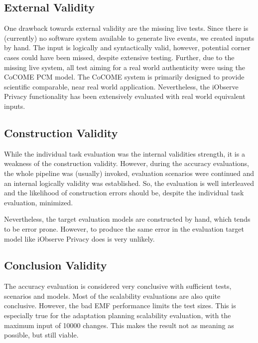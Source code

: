 \subsection{External Validity} %

One drawback towards external validity are the missing live tests. Since there is (currently) no software system available to generate live events, we created inputs by hand. The input is logically and syntactically valid, however, potential corner cases could have been missed, despite extensive testing. Further, due to the missing live system, all test aiming for a real world authenticity were using the CoCOME PCM model. The CoCOME system is primarily designed to provide scientific comparable, near real world application. Nevertheless, the iObserve Privacy functionality has been extensively evaluated with real world equivalent inputs. 



\subsection{Construction Validity}

While the individual task evaluation was the internal validities strength, it is a weakness of the construction validity. However, during the accuracy evaluations, the whole pipeline was (usually) invoked, evaluation scenarios were continued and an internal logically validity was established. So, the evaluation is well interleaved and the likelihood of construction errors should be, despite the individual task evaluation, minimized.

Nevertheless, the target evaluation models are constructed by hand, which tends to be error prone. However, to produce the same error in the evaluation target model like iObserve Privacy does is very unlikely.

\subsection{Conclusion Validity}

The accuracy evaluation is considered very conclusive with sufficient tests, scenarios and models. Most of the scalability evaluations are also quite conclusive. However, the bad EMF performance limits the test sizes. This is especially true for the adaptation planning scalability evaluation, with the maximum input of 10000 changes. This makes the result not as meaning as possible, but still viable.


